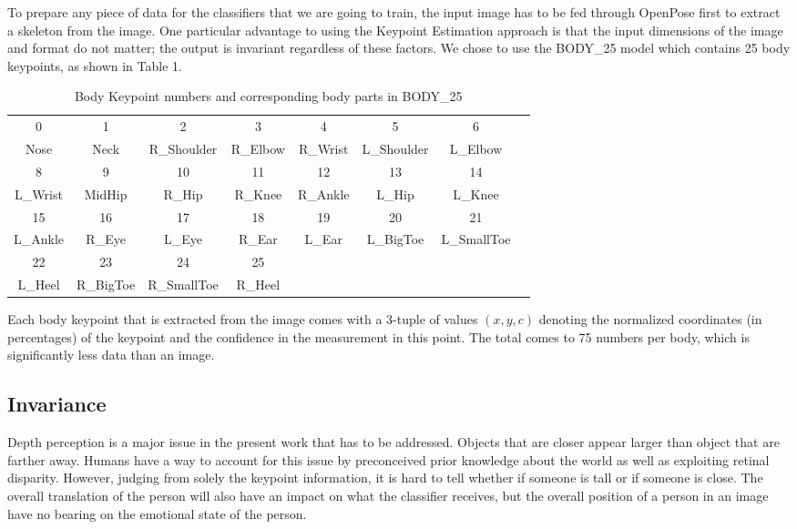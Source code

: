 \documentclass{article}
\begin{document}
To prepare any piece of data for the classifiers that we are going to train, the input image has to be fed through OpenPose first to extract a skeleton from the image. One particular advantage to using the Keypoint Estimation approach is that the input dimensions of the image and format do not matter; the output is invariant regardless of these factors. We chose to use the BODY\_25 model which contains 25 body keypoints, as shown in Table 1.

\begin{table}[h]
	\caption{Body Keypoint numbers and corresponding body parts in BODY\_25}
	\centering
	\begin{tabular}{cccccccc}
	\toprule
	0 & 1 & 2 & 3 & 4 & 5 & 6 \\
	Nose & Neck & R\_Shoulder & R\_Elbow & R\_Wrist & L\_Shoulder & L\_Elbow\\	
	\midrule
	8 & 9 & 10 & 11 & 12 & 13 & 14\\
	L\_Wrist & MidHip & R\_Hip & R\_Knee & R\_Ankle & L\_Hip & L\_Knee\\
	\midrule
	15 & 16 & 17 & 18 & 19 & 20 & 21\\
	L\_Ankle & R\_Eye & L\_Eye & R\_Ear & L\_Ear & L\_BigToe & L\_SmallToe\\
	\midrule
	22 & 23 & 24 & 25\\
	L\_Heel &R\_BigToe & R\_SmallToe & R\_Heel\\
	\midrule
	\end{tabular}
\end{table}

Each body keypoint that is extracted from the image comes with a 3-tuple of values $(x,y,c)$ denoting the normalized coordinates (in percentages) of the keypoint and the confidence in the measurement in this point. The total comes to 75 numbers per body, which is significantly less data than an image.

\subsection{Invariance}
Depth perception is a major issue in the present work that has to be addressed. Objects that are closer appear larger than object that are farther away. Humans have a way to account for this issue by preconceived prior knowledge about the world as well as exploiting retinal disparity. However, judging from solely the keypoint information, it is hard to tell whether if someone is tall or if someone is close. The overall translation of the person will also have an impact on what the classifier receives, but the overall position of a person in an image have no bearing on the emotional state of the person.
\end{document}
